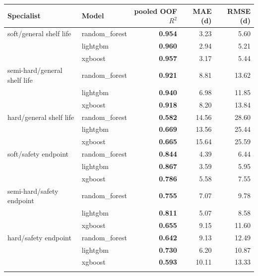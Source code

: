 \begin{tabular}{llrrr}
\toprule
Specialist & Model & pooled OOF $R^2$ & MAE (d) & RMSE (d) \\
\midrule
soft/general shelf life & random\_forest & \textbf{0.954} & 3.23 & 5.60 \\
 & lightgbm & \textbf{0.960} & 2.94 & 5.21 \\
 & xgboost & \textbf{0.957} & 3.17 & 5.44 \\
\addlinespace[2pt]
semi-hard/general shelf life & random\_forest & \textbf{0.921} & 8.81 & 13.62 \\
 & lightgbm & \textbf{0.940} & 6.98 & 11.85 \\
 & xgboost & \textbf{0.918} & 8.20 & 13.84 \\
\addlinespace[2pt]
hard/general shelf life & random\_forest & \textbf{0.582} & 14.56 & 28.60 \\
 & lightgbm & \textbf{0.669} & 13.56 & 25.44 \\
 & xgboost & \textbf{0.665} & 15.64 & 25.59 \\
\addlinespace[2pt]
soft/safety endpoint & random\_forest & \textbf{0.844} & 4.39 & 6.44 \\
 & lightgbm & \textbf{0.867} & 3.59 & 5.95 \\
 & xgboost & \textbf{0.786} & 5.58 & 7.55 \\
\addlinespace[2pt]
semi-hard/safety endpoint & random\_forest & \textbf{0.755} & 7.07 & 9.78 \\
 & lightgbm & \textbf{0.811} & 5.07 & 8.58 \\
 & xgboost & \textbf{0.655} & 9.15 & 11.60 \\
\addlinespace[2pt]
hard/safety endpoint & random\_forest & \textbf{0.642} & 9.13 & 12.49 \\
 & lightgbm & \textbf{0.730} & 6.20 & 10.87 \\
 & xgboost & \textbf{0.593} & 10.11 & 13.33 \\
\addlinespace[2pt]
\bottomrule
\end{tabular}
